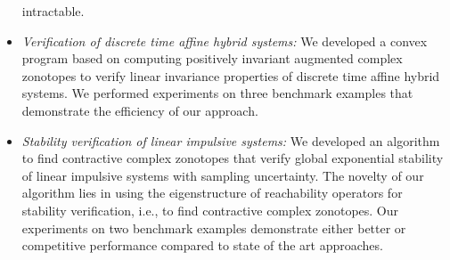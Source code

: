 \begin{itemize}
  intractable.
\item \emph{Verification of discrete time affine hybrid systems:
}  We developed a convex program based on computing positively invariant
  augmented complex zonotopes to verify linear invariance properties
  of discrete time affine hybrid systems.  We performed experiments on
  three benchmark examples that demonstrate the efficiency of our
  approach. 
\item \emph{Stability verification of linear impulsive systems: } We
  developed an algorithm to find contractive complex zonotopes that
  verify global exponential stability of linear impulsive systems with
  sampling uncertainty.  The novelty of our algorithm lies in using
  the eigenstructure of reachability operators for stability
  verification, i.e., to find contractive complex zonotopes. Our
  experiments on two benchmark examples demonstrate either better or
  competitive performance compared to state of the art approaches.
\end{itemize}
%
